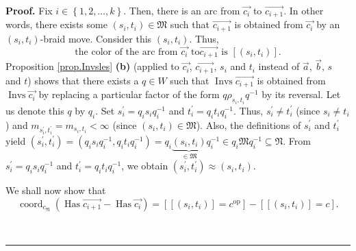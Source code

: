 \documentclass[numbers=enddot,12pt,final,onecolumn,notitlepage,abstracton]{scrartcl}%
\theoremstyle{definition}
\newenvironment{proof}[1][Proof]{\noindent\textbf{#1.} }{\ \rule{0.5em}{0.5em}}
\begin{document}
\begin{proof}
Fix $i\in\left\{  1,2,\ldots,k\right\}  $. Then, there is an arc from
$\overrightarrow{c_{i}}$ to $\overrightarrow{c_{i+1}}$. In other words, there
exists some $\left(  s_{i},t_{i}\right)  \in\mathfrak{M}$ such that
$\overrightarrow{c_{i+1}}$ is obtained from $\overrightarrow{c_{i}}$ by an
$\left(  s_{i},t_{i}\right)  $-braid move. Consider this $\left(  s_{i}%
,t_{i}\right)  $. Thus,%
\begin{equation}
\text{the color of the arc from }\overrightarrow{c_{i}}\text{ to
}\overrightarrow{c_{i+1}}\text{ is }\left[  \left(  s_{i},t_{i}\right)
\right]  . \label{pf.thm.BCL.a.color}%
\end{equation}
Proposition \ref{prop.Invsles} \textbf{(b)} (applied to $\overrightarrow{c_{i}%
}$, $\overrightarrow{c_{i+1}}$, $s_{i}$ and $t_{i}$ instead of
$\overrightarrow{a}$, $\overrightarrow{b}$, $s$ and $t$) shows that there
exists a $q\in W$ such that $\operatorname*{Invs}\overrightarrow{c_{i+1}}$ is
obtained from $\operatorname*{Invs}\overrightarrow{c_{i}}$ by replacing a
particular factor of the form $q\rho_{s_{i},t_{i}}q^{-1}$ by its reversal. Let
us denote this $q$ by $q_{i}$. Set $s_{i}^{\prime}=q_{i}s_{i}q_{i}^{-1}$ and
$t_{i}^{\prime}=q_{i}t_{i}q_{i}^{-1}$. Thus, $s_{i}^{\prime}\neq t_{i}%
^{\prime}$ (since $s_{i}\neq t_{i}$) and $m_{s_{i}^{\prime},t_{i}^{\prime}%
}=m_{s_{i},t_{i}}<\infty$ (since $\left(  s_{i},t_{i}\right)  \in\mathfrak{M}%
$). Also, the definitions of $s_{i}^{\prime}$ and $t_{i}^{\prime}$ yield
$\left(  s_{i}^{\prime},t_{i}^{\prime}\right)  =\left(  q_{i}s_{i}q_{i}%
^{-1},q_{i}t_{i}q_{i}^{-1}\right)  =q_{i}\underbrace{\left(  s_{i}%
,t_{i}\right)  }_{\in\mathfrak{M}}q_{i}^{-1}\in q_{i}\mathfrak{M}q_{i}%
^{-1}\subseteq\mathfrak{N}$. From $s_{i}^{\prime}=q_{i}s_{i}q_{i}^{-1}$ and
$t_{i}^{\prime}=q_{i}t_{i}q_{i}^{-1}$, we obtain $\left(  s_{i}^{\prime}%
,t_{i}^{\prime}\right)  \approx\left(  s_{i},t_{i}\right)  $.

We shall now show that%
\begin{equation}
\operatorname*{coord}\nolimits_{c_{\mathfrak{N}}}\left(  \operatorname*{Has}%
\overrightarrow{c_{i+1}}-\operatorname*{Has}\overrightarrow{c_{i}}\right)
=\left[  \left[  \left(  s_{i},t_{i}\right)  \right]  =c^{\operatorname*{op}%
}\right]  -\left[  \left[  \left(  s_{i},t_{i}\right)  \right]  =c\right]  .
\label{pf.thm.BCL.a.hasdiff1}%
\end{equation}



\end{proof}
\end{document}
